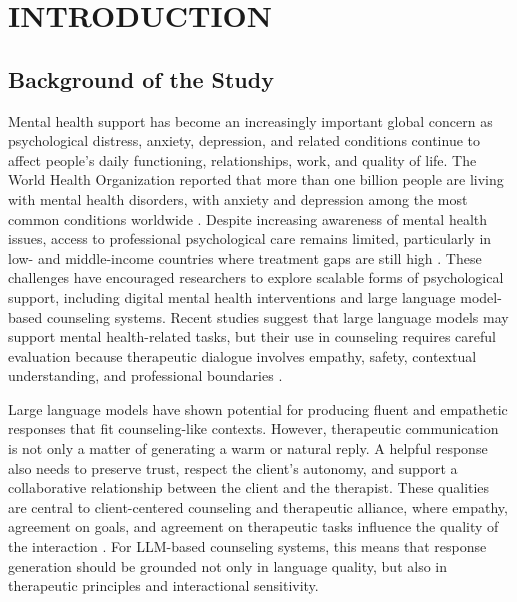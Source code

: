 \chapter{INTRODUCTION} 

\section{Background of the Study}

Mental health support has become an increasingly important global concern as psychological distress, anxiety, depression, and related conditions continue to affect people's daily functioning, relationships, work, and quality of life. The World Health Organization reported that more than one billion people are living with mental health disorders, with anxiety and depression among the most common conditions worldwide \cite{who2025mentalhealth}. Despite increasing awareness of mental health issues, access to professional psychological care remains limited, particularly in low- and middle-income countries where treatment gaps are still high \cite{who2025mentalhealth,kazdin2019mentalhealth}. These challenges have encouraged researchers to explore scalable forms of psychological support, including digital mental health interventions and large language model-based counseling systems. Recent studies suggest that large language models may support mental health-related tasks, but their use in counseling requires careful evaluation because therapeutic dialogue involves empathy, safety, contextual understanding, and professional boundaries \cite{hua2025scopingreview,nguyen2025llmcounseling}.

Large language models have shown potential for producing fluent and empathetic responses that fit counseling-like contexts. However, therapeutic communication is not only a matter of generating a warm or natural reply. A helpful response also needs to preserve trust, respect the client's autonomy, and support a collaborative relationship between the client and the therapist. These qualities are central to client-centered counseling and therapeutic alliance, where empathy, agreement on goals, and agreement on therapeutic tasks influence the quality of the interaction \cite{rogers1957necessary,bordin1979alliance}. For LLM-based counseling systems, this means that response generation should be grounded not only in language quality, but also in therapeutic principles and interactional sensitivity.

